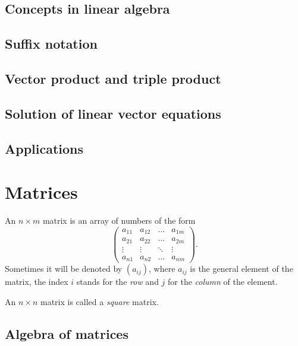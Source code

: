 \documentclass[main.tex]{subfiles}
\begin{document}
		\subsection{Concepts in linear algebra}
			
		\subsection{Suffix notation}
		
		\subsection{Vector product and triple product}
		
		\subsection{Solution of linear vector equations}
		
		\subsection{Applications}
		
	\section{Matrices}
		\begin{definition}
			An $n \times m$ matrix is an array of numbers of the form
			\begin{equation*}
				\begin{pmatrix}
				a_{11} & a_{12} & \ldots & a_{1m} \\
				a_{21} & a_{22} & \ldots & a_{2m} \\
				\vdots & \vdots & \ddots & \vdots \\
				a_{n1} & a_{n2} & \ldots & a_{nm}
				\end{pmatrix}.
			\end{equation*}
			Sometimes it will be denoted by $(a_{ij})$, where $a_{ij}$ is the general element of the matrix, the index $i$ stands for the \textit{row} and $j$ for the \textit{column} of the element.
		\end{definition}
			\begin{definition}
				An $n \times n$ matrix is called a \textit{square} matrix.
			\end{definition}
		\subsection{Algebra of matrices}
		
\end{document}
